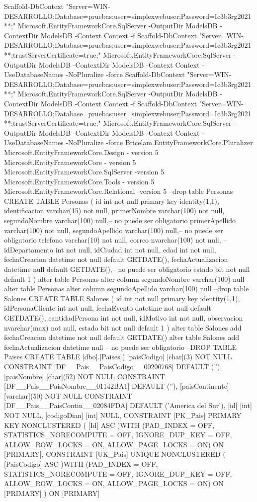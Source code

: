 Scaffold-DbContext "Server=WIN-DESARROLLO\DEVSQLSERVER;Database=pruebas;user=simplexwebuser;Password=Ic3b3rg2021**;" Microsoft.EntityFrameworkCore.SqlServer -OutputDir ModelsDB -ContextDir ModelsDB -Context Context -f
Scaffold-DbContext "Server=WIN-DESARROLLO\DEVSQLSERVER;Database=pruebas;user=simplexwebuser;Password=Ic3b3rg2021**;trustServerCertificate=true;" Microsoft.EntityFrameworkCore.SqlServer -OutputDir ModelsDB -ContextDir ModelsDB -Context Context -UseDatabaseNames -NoPluralize -force
Scaffold-DbContext "Server=WIN-DESARROLLO\DEVSQLSERVER;Database=pruebas;user=simplexwebuser;Password=Ic3b3rg2021**;" Microsoft.EntityFrameworkCore.SqlServer -OutputDir ModelsDB -ContextDir ModelsDB -Context Context -f
Scaffold-DbContext "Server=WIN-DESARROLLO\DEVSQLSERVER;Database=pruebas;user=simplexwebuser;Password=Ic3b3rg2021**;trustServerCertificate=true;" Microsoft.EntityFrameworkCore.SqlServer -OutputDir ModelsDB -ContextDir ModelsDB -Context Context -UseDatabaseNames -NoPluralize -force
Bricelam.EntityFrameworkCore.Pluralizer
Microsoft.EntityFrameworkCore.Design - version 5
Microsoft.EntityFrameworkCore - version 5
Microsoft.EntityFrameworkCore.SqlServer -version 5
Microsoft.EntityFrameworkCore.Tools - version 5
Microsoft.EntityFrameworkCore.Relational -version 5
--drop table Personas
CREATE TABLE Personas
(
	id int not null primary key identity(1,1),
	identificacion varchar(15) not null,
	primerNombre varchar(100) not null,
    segundoNombre  varchar(100)  null,-- no puede ser obligatorio
    primerApellido varchar(100) not null,
    segundoApellido varchar(100) null,-- no puede ser obligatorio
    telefono varchar(10) not null,
    correo nvarchar(100) not null,
    --idDepartamento int not null,
    idCiudad int not null,
    edad int not null,
    fechaCreacion datetime not null default GETDATE(),
	fechaActualizacion datetime null default GETDATE(),-- no puede ser obligatorio
    estado bit not null default 1
)
alter table Personas alter column segundoNombre  varchar(100)  null
alter table Personas alter column segundoApellido  varchar(100)  null
--drop table Salones
CREATE TABLE Salones
(
  id int not null primary key identity(1,1),
  idPersonaCliente int not null,
  fechaEvento datetime not null default GETDATE(),
  cantidadPersona int not null,
  idMotivo int not null,
  observacion nvarchar(max)  not null,
  estado bit not null default 1
)
alter table Salones add fechaCreacion datetime not null default GETDATE() 
alter table Salones add fechaActualizacion datetime null -- no puede ser obligatorio
--DROP TABLE Paises
CREATE TABLE [dbo].[Paises](
	[paisCodigo] [char](3) NOT NULL CONSTRAINT [DF__Pais__PaisCodigo__00200768]  DEFAULT (''),
	[paisNombre] [char](52) NOT NULL CONSTRAINT [DF__Pais__PaisNombre__01142BA1]  DEFAULT (''),
	[paisContinente] [varchar](50) NOT NULL CONSTRAINT [DF__Pais__PaisContin__02084FDA]  DEFAULT ('America del Sur'),
	[id] [int] NOT NULL,
	[codigoDian] [int] NULL,
 CONSTRAINT [PK_Pais] PRIMARY KEY NONCLUSTERED 
(
	[Id] ASC
)WITH (PAD_INDEX = OFF, STATISTICS_NORECOMPUTE = OFF, IGNORE_DUP_KEY = OFF, ALLOW_ROW_LOCKS = ON, ALLOW_PAGE_LOCKS = ON) ON [PRIMARY],
 CONSTRAINT [UK_Pais] UNIQUE NONCLUSTERED 
(
	[PaisCodigo] ASC
)WITH (PAD_INDEX = OFF, STATISTICS_NORECOMPUTE = OFF, IGNORE_DUP_KEY = OFF, ALLOW_ROW_LOCKS = ON, ALLOW_PAGE_LOCKS = ON) ON [PRIMARY]
) ON [PRIMARY]

